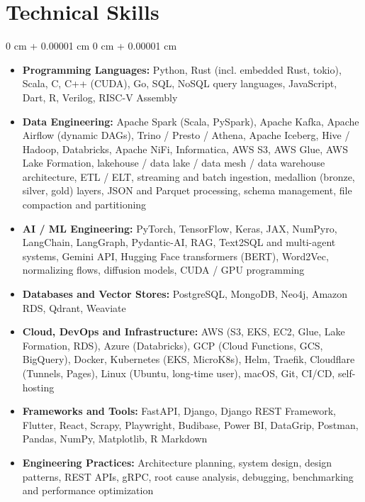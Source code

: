 \documentclass[10pt, letterpaper]{article}
\newenvironment{highlights}{
    \begin{itemize}[
        topsep=0.10 cm,
        parsep=0.10 cm,
        partopsep=0pt,
        itemsep=0pt,
        leftmargin=0 cm + 10pt
    ]
}{
    \end{itemize}
} %
\newenvironment{onecolentry}{
    \begin{adjustwidth}{
        0 cm + 0.00001 cm
    }{
        0 cm + 0.00001 cm
    }
}{
    \end{adjustwidth}
} %
\begin{document}
\section{Technical Skills}
\begin{onecolentry}
    \begin{highlights}
        \item \textbf{Programming Languages:}
        Python, Rust (incl. embedded Rust, tokio), Scala, C, C++ (CUDA), Go, SQL, NoSQL query languages, JavaScript, Dart, R, Verilog, RISC-V Assembly

        \item \textbf{Data Engineering:}
        Apache Spark (Scala, PySpark), Apache Kafka, Apache Airflow (dynamic DAGs), Trino / Presto / Athena, Apache Iceberg, Hive / Hadoop, Databricks, Apache NiFi, Informatica, AWS S3, AWS Glue, AWS Lake Formation, lakehouse / data lake / data mesh / data warehouse architecture, ETL / ELT, streaming and batch ingestion, medallion (bronze, silver, gold) layers, JSON and Parquet processing, schema management, file compaction and partitioning

        \item \textbf{AI / ML Engineering:}
        PyTorch, TensorFlow, Keras, JAX, NumPyro, LangChain, LangGraph, Pydantic-AI, RAG, Text2SQL and multi-agent systems, Gemini API, Hugging Face transformers (BERT), Word2Vec, normalizing flows, diffusion models, CUDA / GPU programming

        \item \textbf{Databases and Vector Stores:}
        PostgreSQL, MongoDB, Neo4j, Amazon RDS, Qdrant, Weaviate

        \item \textbf{Cloud, DevOps and Infrastructure:}
        AWS (S3, EKS, EC2, Glue, Lake Formation, RDS), Azure (Databricks), GCP (Cloud Functions, GCS, BigQuery), Docker, Kubernetes (EKS, MicroK8s), Helm, Traefik, Cloudflare (Tunnels, Pages), Linux (Ubuntu, long-time user), macOS, Git, CI/CD, self-hosting

        \item \textbf{Frameworks and Tools:}
        FastAPI, Django, Django REST Framework, Flutter, React, Scrapy, Playwright, Budibase, Power BI, DataGrip, Postman, Pandas, NumPy, Matplotlib, R Markdown

        \item \textbf{Engineering Practices:}
        Architecture planning, system design, design patterns, REST APIs, gRPC, root cause analysis, debugging, benchmarking and performance optimization
    \end{highlights}
\end{onecolentry}
\end{document}
